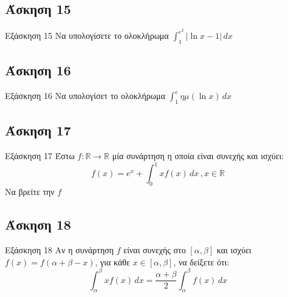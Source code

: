 \documentclass[greek]{beamer}
\begin{document}
\subsection{Άσκηση 15}
\begin{frame}[label=Άσκηση15,t]{Εξάσκηση 15}
  Να υπολογίσετε το ολοκλήρωμα $\int_{1}^{e^2} |\ln x-1| \,dx$

\end{frame}

\subsection{Άσκηση 16}
\begin{frame}[label=Άσκηση16,t]{Εξάσκηση 16}
  Να υπολογίσετ το ολοκλήρωμα $\int_{1}^{e} ημ(\ln x) \,dx$

\end{frame}

\subsection{Άσκηση 17}
\begin{frame}[label=Άσκηση17,t]{Εξάσκηση 17}
   Έστω $f:\mathbb{R}\to\mathbb{R}$ μία συνάρτηση η οποία είναι συνεχής και ισχύει:
   $$f(x)=e^x+\int_{0}^{1} xf(x) \,dx\, , x\in\mathbb{R}$$
   Να βρείτε την $f$

\end{frame}

\subsection{Άσκηση 18}
\begin{frame}[label=Άσκηση18,t]{Εξάσκηση 18}
  Αν η συνάρτηση $f$ είναι συνεχής στο $[α,β]$ και ισχύει $f(x)=f(α+β-x)$, για κάθε $x\in [α,β]$, να δείξετε ότι:
  $$\int_{α}^{β} xf(x) \,dx=\dfrac{α+β}{2}\int_{α}^{β} f(x) \,dx$$

\end{frame}


%
%
%
%
%
%
\end{document}
